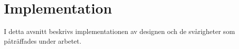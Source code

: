 \section{Implementation}
I detta avsnitt beskrivs implementationen av designen och de svårigheter som
påträffades under arbetet.
